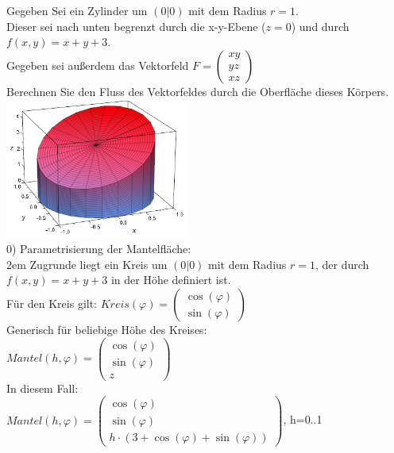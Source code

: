 \documentclass[11pt,final]{scrreprt}
\begin{document}
Gegeben Sei ein Zylinder um $(0|0)$ mit dem Radius $r=1$.\\
Dieser sei nach unten begrenzt durch die x-y-Ebene ($z=0$) und durch $f(x, y)=x+y+3$.\\
Gegeben sei außerdem das Vektorfeld $ F = \left(\begin{matrix}
xy\\ yz\\ xz
\end{matrix}\right) $\\
Berechnen Sie den Fluss des Vektorfeldes durch die Oberfläche dieses Körpers.\\

\includegraphics[width=6cm]{images/integrale/volumen3.png}\\

0) Parametrisierung der Mantelfläche:\\

\begingroup
\leftskip2em 
Zugrunde liegt ein Kreis um $(0|0)$ mit dem Radius $r=1$, der durch $f(x, y)=x+y+3$ in der Höhe definiert ist.\\
Für den Kreis gilt: $Kreis(\varphi) = \left(\begin{matrix}
\cos(\varphi)\\ \sin(\varphi)
\end{matrix}\right)$\\
Generisch für beliebige Höhe des Kreises:\\
$Mantel(h, \varphi) = \left(\begin{matrix}
\cos(\varphi)\\ \sin(\varphi)\\ z
\end{matrix}\right)$\\
In diesem Fall:\\
$Mantel(h, \varphi) = \left(\begin{matrix}
\cos(\varphi)\\ \sin(\varphi)\\ h\cdot(3+\cos(\varphi)+\sin(\varphi))
\end{matrix}\right)$, h=0..1\\
\par	
\endgroup
\end{document}
